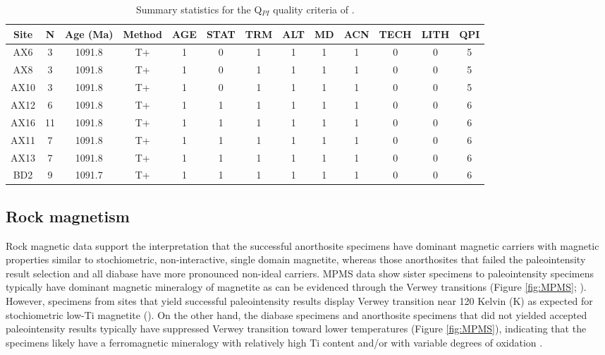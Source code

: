 \documentclass[draft]{agujournal2019}
\begin{document}
\begin{table}[]
\caption{\footnotesize{Summary statistics for the Q$_{PI}$ quality criteria of .}}
\centering
\begin{tabular}{ccccccccccccc}
\hline
Site & N  & Age (Ma) & Method & AGE & STAT & TRM & ALT & MD & ACN & TECH & LITH & QPI \\ \hline
AX6  & 3  & 1091.8   & T+     & 1   & 0    & 1   & 1   & 1  & 1   & 0    & 0    & 5   \\
AX8  & 3  & 1091.8   & T+     & 1   & 0    & 1   & 1   & 1  & 1   & 0    & 0    & 5   \\
AX10 & 3  & 1091.8   & T+     & 1   & 0    & 1   & 1   & 1  & 1   & 0    & 0    & 5   \\
AX12 & 6  & 1091.8   & T+     & 1   & 1    & 1   & 1   & 1  & 1   & 0    & 0    & 6   \\
AX16 & 11 & 1091.8   & T+     & 1   & 1    & 1   & 1   & 1  & 1   & 0    & 0    & 6   \\
AX11 & 7  & 1091.8   & T+     & 1   & 1    & 1   & 1   & 1  & 1   & 0    & 0    & 6   \\
AX13 & 7  & 1091.8   & T+     & 1   & 1    & 1   & 1   & 1  & 1   & 0    & 0    & 6   \\ \hline
BD2  & 9  & 1091.7   & T+     & 1   & 1    & 1   & 1   & 1  & 1   & 0    & 0    & 6   \\ \hline
\end{tabular}
\label{tab:QPI}
\end{table}

\subsection*{Rock magnetism}
Rock magnetic data support the interpretation that the successful anorthosite specimens have dominant magnetic carriers with magnetic properties similar to stochiometric, non-interactive, single domain magnetite, whereas those anorthosites that failed the paleointensity result selection and all diabase have more pronounced non-ideal carriers. MPMS data show sister specimens to paleointensity specimens typically have dominant magnetic mineralogy of magnetite as can be evidenced through the Verwey transitions (Figure \ref{fig:MPMS}; ). However, specimens from sites that yield successful paleointensity results display Verwey transition near 120 Kelvin (K) as expected for stochiometric low-Ti magnetite (\cite{Ozdemir1993a}). On the other hand, the diabase specimens and anorthosite specimens that did not yielded accepted paleointensity results typically have suppressed Verwey transition toward lower temperatures (Figure \ref{fig:MPMS}), indicating that the specimens likely have a ferromagnetic mineralogy with relatively high Ti content and/or with variable degrees of oxidation \cite{Ozdemir1993a}. 
 
\end{document}

